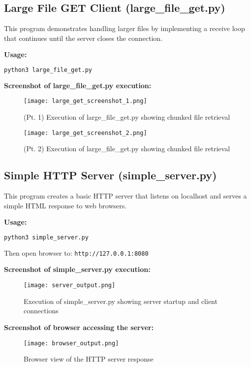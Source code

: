 \documentclass[12pt]{article}
\begin{document}
\subsection{Large File GET Client (large\_file\_get.py)}

This program demonstrates handling larger files by implementing a receive loop that continues until the server closes the connection.

\textbf{Usage:}
\begin{lstlisting}[language=bash]
python3 large_file_get.py
\end{lstlisting}

\textbf{Screenshot of large\_file\_get.py execution:}

\begin{figure}[H]
    \centering
    \texttt{[image: large\_get\_screenshot\_1.png]}
    \caption{(Pt. 1) Execution of large\_file\_get.py showing chunked file retrieval}
    \label{fig:large_get_1}
\end{figure}

\begin{figure}[H]
    \centering
    \texttt{[image: large\_get\_screenshot\_2.png]}
    \caption{(Pt. 2) Execution of large\_file\_get.py showing chunked file retrieval}
    \label{fig:large_get_2}
\end{figure}

\subsection{Simple HTTP Server (simple\_server.py)}

This program creates a basic HTTP server that listens on localhost and serves a simple HTML response to web browsers.

\textbf{Usage:}
\begin{lstlisting}[language=bash]
python3 simple_server.py
\end{lstlisting}

Then open browser to: \texttt{http://127.0.0.1:8080}

\textbf{Screenshot of simple\_server.py execution:}

\begin{figure}[H]
    \centering
    \texttt{[image: server\_output.png]}
    \caption{Execution of simple\_server.py showing server startup and client connections}
    \label{fig:server_terminal}
\end{figure}

\textbf{Screenshot of browser accessing the server:}

\begin{figure}[H]
    \centering
    \texttt{[image: browser\_output.png]}
    \caption{Browser view of the HTTP server response}
    \label{fig:server_browser}
\end{figure}
\end{document}

